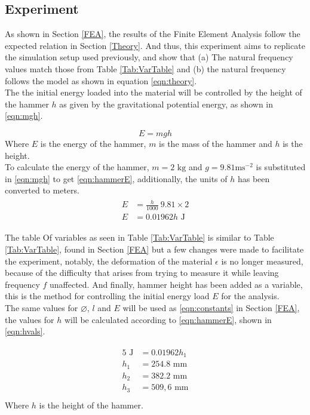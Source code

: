 \documentclass[a4paper,12pt]{article}
\begin{document}
    \subsection{Experiment}\label{Experiment}%
    As shown in Section \ref{FEA}, the results of the Finite Element Analysis follow the expected relation in Section \ref{Theory}. And thus, this experiment aims to replicate the simulation setup used previously, and show that (a) The natural frequency values match those from Table \ref{Tab:VarTable} and (b) the natural frequency follows the model as shown in equation \eqref{eqn:theory}.\\
    The the initial energy loaded into the material will be controlled by the height of the hammer $h$ as given by the gravitational potential energy, as shown in \eqref{eqn:mgh}.

    \begin{equation}\label{eqn:mgh}
     E=mgh
    \end{equation}
    Where $E$ is the energy of the hammer, $m$ is the mass of the hammer and $h$ is the height.\\
    To calculate the energy of the hammer, $m=2\text{ kg}$ and $g=9.81\text{ms}^{-2}$ is substituted in \eqref{eqn:mgh} to get \eqref{eqn:hammerE}, additionally, the units of $h$ has been converted to meters.
    \begin{align}%
    \label{eqn:hammerE}
    \begin{split}
     E&=\frac{h}{1000}~9.81\times2\\
     E&=0.01962h \text{ J}
    \end{split}
    \end{align}

    The table Of variables as seen in  Table \ref{Tab:VarTable} is similar to Table \ref{Tab:VarTable}, found in Section \ref{FEA} but a few changes were made to facilitate the experiment, notably, the deformation of the material $\epsilon$ is no longer measured, because of the difficulty that arises from trying to measure it while leaving frequency $f$ unaffected. And finally, hammer height has been added as a variable, this is the method for controlling the initial energy load $E$ for the analysis.\\
    The same values for $\diameter$, $l$ and $E$ will be used as \eqref{eqn:constants} in Section \ref{FEA}, the values for $h$ will be calculated according to \eqref{eqn:hammerE}, shown in \eqref{eqn:hvals}.

    \begin{align}%
    \label{eqn:hvals}
    \begin{split}
     5 \text{ J}&=0.01962h_1\\
     h_1&=254.8\text{ mm}\\
     h_2&=382.2\text{ mm}\\
     h_3&=509,6\text{ mm}\\
    \end{split}
    \end{align}
    Where $h$ is the height of the hammer.
\end{document}
